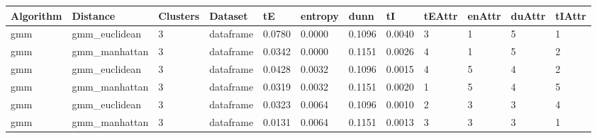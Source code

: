 \begin{itemize}
{\small
\begin{longtable}{| p{1cm} | p{1.8cm} | p{0.7cm} | p{0.9cm} | p{0.5cm} | p{0.65cm} | p{0.5cm} | p{0.5cm} | p{0.55cm} | p{0.55cm} | p{0.6cm} | p{0.5cm} |}
\hline
\scriptsize  Algorithm & \scriptsize  Distance  &  \scriptsize Clusters & \scriptsize  Dataset & \scriptsize tE & \scriptsize entropy & \scriptsize  dunn  & \scriptsize tI & \scriptsize tEAttr & \scriptsize enAttr & \scriptsize duAttr & \scriptsize tIAttr  \\
\hline
\scriptsize      gmm     & \scriptsize  gmm\_euclidean & \scriptsize    3     & \scriptsize dataframe & \scriptsize    0.0780    & \scriptsize 0.0000  & \scriptsize 0.1096 & \scriptsize    0.0040    & \scriptsize        3         & \scriptsize     1       & \scriptsize      5    & \scriptsize        1 \\
\cline{2-12}
\scriptsize      gmm     & \scriptsize  gmm\_manhattan & \scriptsize    3     & \scriptsize dataframe & \scriptsize    0.0342    & \scriptsize 0.0000  & \scriptsize 0.1151 & \scriptsize    0.0026    & \scriptsize        4         & \scriptsize     1       & \scriptsize      5    & \scriptsize        2 \\
\cline{2-12}
\scriptsize      gmm     & \scriptsize  gmm\_euclidean & \scriptsize    3     & \scriptsize dataframe & \scriptsize    0.0428    & \scriptsize 0.0032  & \scriptsize 0.1096 & \scriptsize    0.0015    & \scriptsize        4         & \scriptsize     5       & \scriptsize      4    & \scriptsize        2 \\
\cline{2-12}
\scriptsize      gmm     & \scriptsize  gmm\_manhattan & \scriptsize    3     & \scriptsize dataframe & \scriptsize    0.0319    & \scriptsize 0.0032  & \scriptsize 0.1151 & \scriptsize    0.0020    & \scriptsize        1         & \scriptsize     5       & \scriptsize      4    & \scriptsize        5 \\
\cline{2-12}
\scriptsize      gmm     & \scriptsize  gmm\_euclidean & \scriptsize    3     & \scriptsize dataframe & \scriptsize    0.0323    & \scriptsize 0.0064  & \scriptsize 0.1096 & \scriptsize    0.0010    & \scriptsize        2         & \scriptsize     3       & \scriptsize      3    & \scriptsize        4 \\
\cline{2-12}
\scriptsize      gmm     & \scriptsize  gmm\_manhattan & \scriptsize    3     & \scriptsize dataframe & \scriptsize    0.0131    & \scriptsize 0.0064  & \scriptsize 0.1151 & \scriptsize    0.0013    & \scriptsize        3         & \scriptsize     3       & \scriptsize      3    & \scriptsize        1 \\

\end{longtable}}
\end{itemize}
